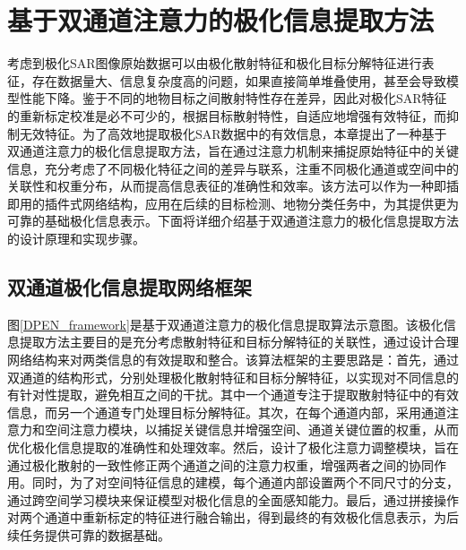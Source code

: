 \section{基于双通道注意力的极化信息提取方法}
考虑到极化SAR图像原始数据可以由极化散射特征和极化目标分解特征进行表征，存在数据量大、信息复杂度高的问题，如果直接简单堆叠使用，甚至会导致模型性能下降。鉴于不同的地物目标之间散射特性存在差异，因此对极化SAR特征的重新标定校准是必不可少的，根据目标散射特性，自适应地增强有效特征，而抑制无效特征。为了高效地提取极化SAR数据中的有效信息，本章提出了一种基于双通道注意力的极化信息提取方法，旨在通过注意力机制来捕捉原始特征中的关键信息，充分考虑了不同极化特征之间的差异与联系，注重不同极化通道或空间中的关联性和权重分布，从而提高信息表征的准确性和效率。该方法可以作为一种即插即用的插件式网络结构，应用在后续的目标检测、地物分类任务中，为其提供更为可靠的基础极化信息表示。下面将详细介绍基于双通道注意力的极化信息提取方法的设计原理和实现步骤。

\subsection{双通道极化信息提取网络框架}

图\ref{DPEN_framework}是基于双通道注意力的极化信息提取算法示意图。该极化信息提取方法主要目的是充分考虑散射特征和目标分解特征的关联性，通过设计合理网络结构来对两类信息的有效提取和整合。该算法框架的主要思路是：首先，通过双通道的结构形式，分别处理极化散射特征和目标分解特征，以实现对不同信息的有针对性提取，避免相互之间的干扰。其中一个通道专注于提取散射特征中的有效信息，而另一个通道专门处理目标分解特征。其次，在每个通道内部，采用通道注意力和空间注意力模块，以捕捉关键信息并增强空间、通道关键位置的权重，从而优化极化信息提取的准确性和处理效率。然后，设计了极化注意力调整模块，旨在通过极化散射的一致性修正两个通道之间的注意力权重，增强两者之间的协同作用。同时，为了对空间特征信息的建模，每个通道内部设置两个不同尺寸的分支，通过跨空间学习模块来保证模型对极化信息的全面感知能力。最后，通过拼接操作对两个通道中重新标定的特征进行融合输出，得到最终的有效极化信息表示，为后续任务提供可靠的数据基础。


